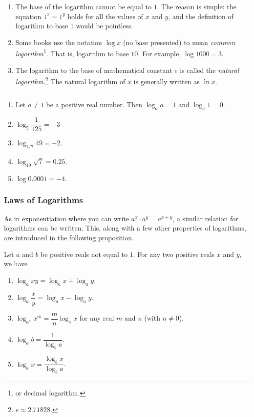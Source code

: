 \documentclass{subfile}
\begin{document}
	\begin{remark}
		$ $
		\begin{enumerate}
			\item The base of the logarithm cannot be equal to $1$. The reason is simple: the equation $1^x = 1^y$ holds for all the values of $x$ and $y$, and the definition of logarithm to base $1$ would be pointless\watermark.

			\item Some books use the notation $\log x$ (no base presented) to mean \textit{common logarithm}\footnote{or decimal logarithm.}. That is, logarithm to base $10$. For example, $\log 1000=3$.

			\item The logarithm to the base of mathematical constant $e$ is called the \textit{natural logarithm}.\footnote{$e\approx 2.71828.$} The natural logarithm of $x$ is generally written as $\ln x$.
		\end{enumerate}
	\end{remark}

	\begin{example}
		$ $
		\begin{enumerate}
			\item Let $a \neq 1$ be a positive real number. Then $\log_a a=1$ and $\log_a 1 = 0$.
			\item $\log_5 \dfrac{1}{125}=-3$.
			\item $\log_{1/7} 49 = -2$.
			\item $\log_{49} \sqrt 7 = 0.25$.
			\item $\log 0.0001 = -4$.
		\end{enumerate}
	\end{example}
\subsubsection{Laws of Logarithms}


	As in exponentiation where you can write $a^x \cdot a^y = a^{x+y}$, a similar relation for logarithms can be written. This, along with a few other properties of logarithms, are introduced in the following proposition.

	\begin{proposition}\label{prop:log_laws}
		Let $a$ and $b$ be positive reals not equal to $1$. For any two positive reals $x$ and $y$, we have
		\begin{enumerate}
			\item $\log_a xy = \log_a x + \log_a y$.
			\item $\log_a \dfrac{x}{y} = \log_a x - \log_a y$.
			\item $\log_{a^n} x^m = \dfrac{m}{n}\log_a x$ for any real $m$ and $n$ (with $n \neq 0$).
			\item $\log_a b = \dfrac{1}{\log_b a}$.
			\item $\log_a x = \dfrac{\log_b x}{\log_b a}$.
		\end{enumerate}
	\end{proposition}
\end{document}

